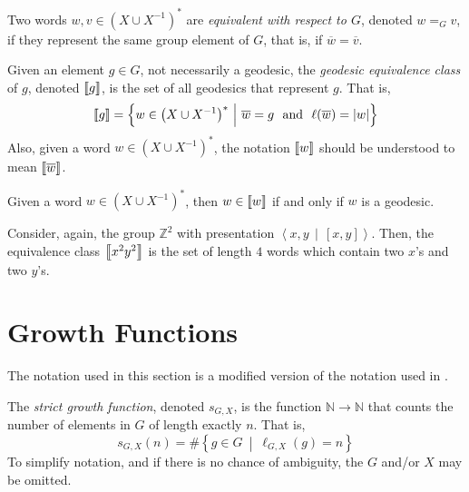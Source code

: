 \begin{definition}
	Two words $w,v \in \left(X\cup X^{-1}\right)^\ast$ are \emph{equivalent with respect to $G$}, denoted $w =_G v$, if they represent the same group element of $G$, that is, if $\overline{w} = \overline{v}$.
\end{definition}

\begin{definition}
	Given an element $g \in G$, not necessarily a geodesic, the \emph{geodesic equivalence class} of $g$, denoted $\left\llbracket g \right\rrbracket$, is the set of all geodesics that represent $g$.
	That is,
	\[
	\equivClass{g}
	=
	\left\lbrace
	w \in \left(X \cup X^{-1}\right)^\ast
	\  \middle\vert \ 
	\overline{w} = g
	\ \ 
	\text{and}
	\ \ 
	\ell(\overline{w}) =  \left\vert w \right\vert
	\right\rbrace
	\]
	Also, given a word $w \in \left(X \cup X^{-1}\right)^\ast$, the notation $\left\llbracket w \right\rrbracket$ should be understood to mean $\left\llbracket \overline{w} \right\rrbracket$.
\end{definition}

\begin{remark}
	Given a word $w \in \left(X \cup X^{-1}\right)^\ast$, then $w \in \left\llbracket w \right\rrbracket$ if and only if $w$ is a geodesic.
\end{remark}

\begin{example}
	Consider, again, the group $\mathbb{Z}^2$ with presentation $\left\langle x,y \, \middle\vert \, [x,y] \right\rangle$.
	Then, the equivalence class $\left\llbracket x^2 y^2 \right\rrbracket$ is the set of length $4$ words which contain two $x$'s and two $y$'s.
\end{example}

\newpage
\section{Growth Functions}
\label{sec:growth-functions}

The notation used in this section is a modified version of the notation used in \cite{HowGroupsGrow}.


\begin{definition}
	\label{def:strictGrowth}
	The \emph{strict growth function}, denoted $s_{G,X}$, is the function $\mathbb{N} \to \mathbb{N}$ that counts the number of elements in $G$ of length exactly $n$.
	That is,
	\[
	  s_{G,X}(n)
	  =
	  \#
	    \left\lbrace
	      g \in G
	      \ \middle\vert\ 
	      \ell_{G,X}(g) = n
	    \right\rbrace
	\]
	To simplify notation, and if there is no chance of ambiguity, the $G$ and/or $X$ may be omitted.
\end{definition}

